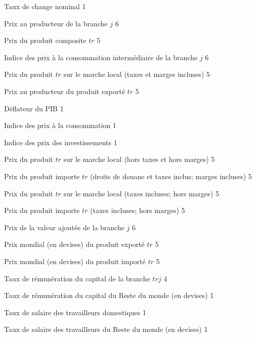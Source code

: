 \documentclass[11pt,a4paper]{article}
\newcommand{\trj}{\mathit{trj}}
\newcommand{\PE}{\mathit{PE}}
\newcommand{\PC}{\mathit{PC}}
\newcommand{\PCI}{\mathit{PCI}}
\newcommand{\PD}{\mathit{PD}}
\newcommand{\PPD}{\mathit{PPD}}
\newcommand{\PIXPIB}{\mathit{PIXPIB}}
\newcommand{\PIXCON}{\mathit{PIXCON}}
\newcommand{\PIXINV}{\mathit{PIXINV}}
\newcommand{\PL}{\mathit{PL}}
\newcommand{\PM}{\mathit{PM}}
\newcommand{\PPM}{\mathit{PPM}}
\newcommand{\PWE}{\mathit{PWE}}
\newcommand{\PWM}{\mathit{PWM}}
\newcommand{\PVA}{\mathit{PVA}}
\newcommand{\tr}{\mathit{tr}}
\begin{document}
	\begin{description}[leftmargin=!,labelwidth=\widthof{\bfseries AAAAAAAA},parsep=10pt]
		\item[$e$]			Taux de change nominal 					\hfill 1
		\item[$P_j$]		Prix au producteur de la branche $j$ 	\hfill 6
		\item[$\PC_{\tr}$]	Prix du produit composite $\tr$ 		\hfill 5
		\item[$\PCI_j$]		Indice des prix à la consommation intermédiaire de la branche $j$ 	\hfill 6
		\item[$\PD_{\tr}$]	Prix du produit $tr$ sur le marche local (taxes et marges incluses)	\hfill 5
		\item[$\PE_{\tr}$]	Prix au producteur du produit exporté $\tr$ 	\hfill 5
		\item[$\PIXPIB$]	Déflateur du PIB 								\hfill 1
		\item[$\PIXCON$]    Indice des prix à la consommation 				\hfill 1
		\item[$\PIXINV$]    Indice des prix des investissements				\hfill 1
		\item[$\PL_{\tr}$]	Prix du produit $\tr$ sur le marche local (hors taxes et hors marges)				\hfill 5
		\item[$\PM_{\tr}$]	Prix du produit importe $\tr$ (droits de douane et taxes inclus; marges incluses)	\hfill 5
		\item[$\PPD_{\tr}$]	Prix du produit $\tr$ sur le marche local (taxes incluses; hors marges)				\hfill 5
		\item[$\PPM_{\tr}$]	Prix du produit importe $\tr$ (taxes incluses; hors marges) \hfill 5
		\item[$\PVA_j$]		Prix de la valeur ajoutée de la branche $j$ 				\hfill 6
		\item[$\PWE_{\tr}$]	Prix mondial (en devises) du produit exporté $\tr$ 			\hfill 5
		\item[$\PWM_{\tr}$]	Prix mondial (en devises) du produit importé $\tr$ 			\hfill 5
		\item[$R_{\trj}$]	Taux de rémunération du capital de la branche $\trj$		\hfill 4
		\item[$R^R$]		Taux de rémunération du capital du Reste du monde (en devises) 		\hfill 1
		\item[$W$]			Taux de salaire des travailleurs domestiques				\hfill 1
		\item[$W^R$]		Taux de salaire des travailleurs du Reste du monde (en devises)		\hfill 1
		
	\end{description}
\end{document}
